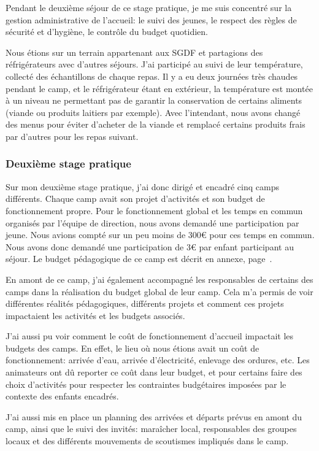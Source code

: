 \documentclass[titlepage,11pt,a4paper]{article}
\begin{document}
Pendant le deuxième séjour de ce stage pratique, je me suis concentré sur la gestion
administrative de l'accueil: le suivi des jeunes, le respect des règles de sécurité et
d'hygiène, le contrôle du budget quotidien.

Nous étions sur un terrain appartenant aux SGDF et partagions des réfrigérateurs avec
d'autres séjours. J'ai participé au suivi de leur température, collecté des échantillons de
chaque repas. Il y a eu deux journées très chaudes pendant le camp, et le réfrigérateur
étant en extérieur, la température est montée à un niveau ne permettant pas de garantir la
conservation de certains aliments (viande ou produits laitiers par exemple). Avec
l'intendant, nous avons changé des menus pour éviter d'acheter de la viande et remplacé
certains produits frais par d'autres pour les repas suivant.

\subsubsection{Deuxième stage pratique}


Sur mon deuxième stage pratique, j'ai donc dirigé et encadré cinq camps différents. Chaque camp avait son
projet d'activités et son budget de fonctionnement propre. Pour le fonctionnement global et les
temps en commun organisés par l'équipe de direction, nous avons demandé une participation
par jeune. Nous avions compté sur un peu moins de 300€ pour ces temps en commun. Nous
avons donc demandé une participation de 3€ par enfant participant au séjour. Le budget
pédagogique de ce camp est décrit en annexe, page~\pageref{budgped}.

En amont de ce camp, j'ai également accompagné les responsables de certains des camps dans
la réalisation du budget global de leur camp. Cela m'a permis de voir différentes
réalités pédagogiques, différents projets et comment ces projets impactaient les activités
et les budgets associés.

J'ai aussi pu voir comment le coût de fonctionnement d'accueil
impactait les budgets des camps. En effet, le lieu où nous étions avait un coût de
fonctionnement: arrivée d'eau, arrivée d'électricité, enlevage des ordures, etc. Les
animateurs ont dû reporter ce coût dans leur budget, et pour certains faire des choix
d'activités pour respecter les contraintes budgétaires imposées par le contexte des
enfants encadrés.

J'ai aussi mis en place un planning des arrivées et départs prévus en amont du camp, ainsi
que le suivi des invités: maraîcher local, responsables des groupes locaux et des
différents mouvements de scoutismes impliqués dans le camp.
\end{document}
